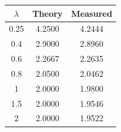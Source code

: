 \begin{tabular}{ccc}
\toprule
$\lambda$ & Theory & Measured \\
\midrule
0.25 & 4.2500 & 4.2444 \\
0.4 & 2.9000 & 2.8960 \\
0.6 & 2.2667 & 2.2635 \\
0.8 & 2.0500 & 2.0462 \\
1 & 2.0000 & 1.9800 \\
1.5 & 2.0000 & 1.9546 \\
2 & 2.0000 & 1.9522 \\
\bottomrule
\end{tabular}
